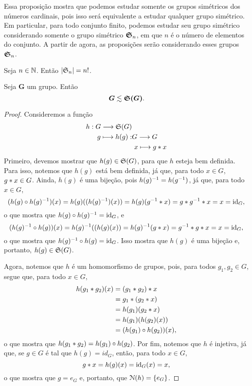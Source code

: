 	Essa proposição mostra que podemos estudar somente os grupos simétricos dos números cardinais, pois isso será equivalente a estudar qualquer grupo simétrico. Em particular, para todo conjunto finito, podemos estudar seu grupo simétrico considerando somente o grupo simétrico $\bm{\mathfrak{S}}_n$, em que $n$ é o número de elementos do conjunto. A partir de agora, as proposições serão considerando esses grupos $\bm{\mathfrak{S}}_n$.

\begin{prop}
	Seja $n \in \mathbb{N}$. Então $|\mathfrak{S}_n|=n!$.
\end{prop}

\begin{teo}
	Seja $\bm G$ um grupo. Então
	\begin{equation*}
	\bm G \lesssim \bm{\mathfrak{S}(G)}.
	\end{equation*}
\end{teo}
\begin{proof}
	Consideremos a função
	\begin{align*}
	h: G \longrightarrow \mathfrak{S}(G) & \\
		g \longmapsto h(g): & G \longrightarrow G \\
									&\ x \longmapsto g \ast x \\
	\end{align*}
Primeiro, devemos mostrar que $h(g) \in \mathfrak{S}(G)$, para que $h$ esteja bem definida. Para isso, notemos que $h(g)$ está bem definida, já que, para todo $x \in G$, $g \ast x \in G$. Ainda, $h(g)$ é uma bijeção, pois $h(g)^{-1} = h(g^{-1})$, já que, para todo $x \in G$,
	\begin{equation*}
	(h(g) \circ h(g)^{-1})(x) = h(g)((h(g)^{-1})(x)) = h(g)(g^{-1} \ast x) = g \ast g^{-1} \ast x = x = \mathrm{id}_G,
	\end{equation*}
o que mostra que $h(g) \circ h(g)^{-1} = \mathrm{id}_G$, e
	\begin{equation*}
	(h(g)^{-1} \circ h(g))(x) = h(g)^{-1}((h(g)(x)) = h(g)^{-1}(g \ast x) = g^{-1} \ast g \ast x = x = \mathrm{id}_G,
	\end{equation*}
o que mostra que $h(g)^{-1} \circ h(g) = \mathrm{id}_G$. Isso mostra que $h(g)$ é uma bijeção e, portanto, $h(g) \in \mathfrak{S}(G)$.

	Agora, notemos que $h$ é um homomorfismo de grupos, pois, para todos $g_1,g_2 \in G$, segue que, para todo $x \in G$,
	\begin{align*}
	h(g_1 \ast g_2)(x) &= (g_1 \ast g_2) \ast x \\
	&= g_1 \ast (g_2 \ast x) \\
	&= h(g_1)(g_2 \ast x) \\
	&= h(g_1)(h(g_2)(x)) \\
	&= (h(g_1) \circ h(g_2))(x),
	\end{align*}
o que mostra que $h(g_1 \ast g_2) = h(g_1) \circ h(g_2)$. Por fim, notemos que $h$ é injetiva, já que, se $g \in G$ é tal que $h(g)=id_G$, então, para todo $x \in G$,
	\begin{equation*}
	g \ast x = h(g)(x) = \mathrm{id}_G(x) = x,
	\end{equation*}
o que mostra que $g=e_G$ e, portanto, que $\mathcal{N}(h)=\{e_G\}$.
\end{proof}

